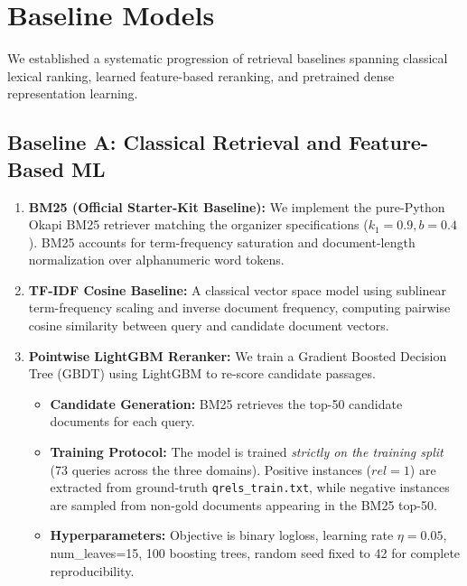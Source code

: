 \section{Baseline Models}
\label{sec:baselines}

We established a systematic progression of retrieval baselines spanning classical lexical ranking, learned feature-based reranking, and pretrained dense representation learning.

\subsection{Baseline A: Classical Retrieval and Feature-Based ML}
\begin{enumerate}
    \item \textbf{BM25 (Official Starter-Kit Baseline):} We implement the pure-Python Okapi BM25 retriever matching the organizer specifications ($k_1=0.9, b=0.4$). BM25 accounts for term-frequency saturation and document-length normalization over alphanumeric word tokens.
    \item \textbf{TF-IDF Cosine Baseline:} A classical vector space model using sublinear term-frequency scaling and inverse document frequency, computing pairwise cosine similarity between query and candidate document vectors.
    \item \textbf{Pointwise LightGBM Reranker:} We train a Gradient Boosted Decision Tree (GBDT) using LightGBM \cite{lightgbm} to re-score candidate passages.
    \begin{itemize}
        \item \textbf{Candidate Generation:} BM25 retrieves the top-50 candidate documents for each query.
        \item \textbf{Training Protocol:} The model is trained \textit{strictly on the training split} (73 queries across the three domains). Positive instances ($rel=1$) are extracted from ground-truth \texttt{qrels\_train.txt}, while negative instances are sampled from non-gold documents appearing in the BM25 top-50.
        \item \textbf{Hyperparameters:} Objective is binary logloss, learning rate $\eta=0.05$, num\_leaves=15, 100 boosting trees, random seed fixed to 42 for complete reproducibility.
    \end{itemize}
\end{enumerate}


